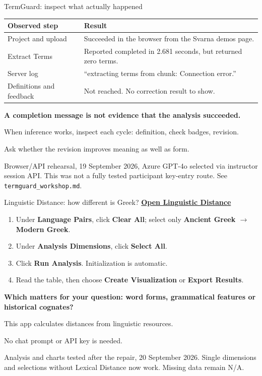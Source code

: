 \documentclass[aspectratio=169,10pt]{beamer}
\newcommand{\key}[1]{\textcolor{aegean}{\textbf{#1}}}
\newcommand{\source}[1]{\vfill{\scriptsize\color{slate}#1\par}}
\newcommand{\question}[1]{\medskip\par\key{#1}\par}
\begin{document}
\begin{frame}{TermGuard: inspect what actually happened}
  \small
  \begin{tabularx}{\textwidth}{@{}lX@{}}
    \toprule
    \textbf{Observed step} & \textbf{Result}\\
    \midrule
    Project and upload & Succeeded in the browser from the Svarna demos page.\\[7pt]
    Extract Terms & Reported completed in 2.681 seconds, but returned zero terms.\\[7pt]
    Server log & “extracting terms from chunk: Connection error.”\\[7pt]
    Definitions and feedback & Not reached. No correction result to show.\\
    \bottomrule
  \end{tabularx}
  \question{A completion message is not evidence that the analysis succeeded.}
  When inference works, inspect each cycle: definition, check badges, revision.\par
  Ask whether the revision improves meaning as well as form.
  \source{Browser/API rehearsal, 19 September 2026, Azure GPT-4o selected via instructor session API.\newline
  This was not a fully tested participant key-entry route. See \texttt{termguard\_workshop.md}.}
\end{frame}

\begin{frame}{Linguistic Distance: how different is Greek?}
  \small
  \href{https://greek-app-heaven-linguistic.livelyhill-85880e66.westeurope.azurecontainerapps.io}{\key{Open Linguistic Distance}}
  \begin{enumerate}
    \item Under \textbf{Language Pairs}, click \textbf{Clear All}; select only \textbf{Ancient Greek $\rightarrow$ Modern Greek}.
    \item Under \textbf{Analysis Dimensions}, click \textbf{Select All}.
    \item Click \textbf{Run Analysis}. Initialization is automatic.
    \item Read the table, then choose \textbf{Create Visualization} or \textbf{Export Results}.
  \end{enumerate}
  \question{Which matters for your question: word forms, grammatical features or historical cognates?}
  This app calculates distances from linguistic resources.\par
  No chat prompt or API key is needed.
  \source{Analysis and charts tested after the repair, 20 September 2026.\newline
  Single dimensions and selections without Lexical Distance now work. Missing data remain N/A.}
\end{frame}
\end{document}
